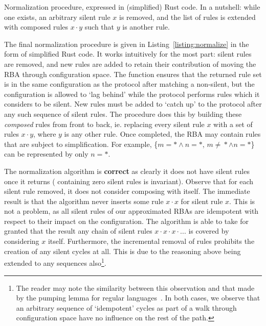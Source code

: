 \begin{listing}[ht]
	\inputminted[]{rust}{normalize.rs}
	\caption[Normalization procedure Rusty-pseudocode.]{Normalization procedure, expressed in (simplified) Rust code. In a nutshell: while one exists, an arbitrary silent rule $x$ is removed, and the list of rules is extended with composed rules $x\cdot{}y$ such that $y$ is another rule.}
	\label{listing:normalize}
\end{listing}

The final normalization procedure is given in Listing~\ref{listing:normalize} in the form of simplified Rust code. It works intuitively for the most part: silent rules are removed, and new rules are added to retain their contribution of moving the RBA through configuration space. The function  ensures that the returned rule set is in the same configuration as the protocol after matching a non-silent, but the configuration is allowed to `lag behind' while the protocol performs rules which it considers to be silent. New rules must be added to `catch up' to the protocol after any such sequence of silent rules. The procedure does this by building these \textit{composed} rules from front to back, ie. replacing every silent rule $x$ with a set of rules $x\cdot{}y$, where $y$ is any other rule. Once completed, the RBA may contain rules that are subject to simplification. For example, \{$m=*\wedge{}n=*$, $m\neq{}*\wedge{}n=*$\} can be represented by only $n=*$.

The normalization algorithm is \textbf{correct} as clearly it does not have silent rules once it returns ( containing zero silent rules is invariant). Observe that for each silent rule removed, it does not consider composing with itself. The immediate result is that the algorithm never inserts some rule $x\cdot{}x$ for silent rule $x$. This is not a problem, as all silent rules of our approximated RBAs are idempotent with respect to their impact on the configuration. The algorithm is able to take for granted that the result any chain of silent rules $x\cdot{}x\cdot{}x\cdot{}...$ is covered by considering $x$ itself. Furthermore, the incremental removal of rules prohibits the creation of any silent cycles at all. This is due to the reasoning above being extended to any sequences also\footnote{The reader may note the similarity between this observation and that made by the pumping lemma for regular languages~\cite{linz2006introduction}. In both cases, we observe that an arbitrary sequence of `idempotent' cycles as part of a walk through configuration space have no influence on the rest of the path.}. 


